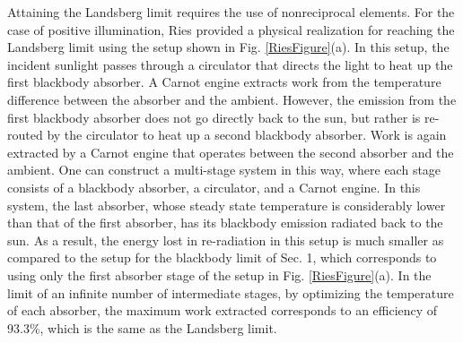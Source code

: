 \documentclass[notitlepage,onecolumn,aps,showpacs,preprintnumbers,amsmath,amssymb,superscriptaddress]{revtex4-1}
\begin{document}
Attaining the Landsberg limit requires the use of nonreciprocal elements. For the case of positive illumination, Ries \citep{ries, greentime} provided a physical realization for reaching the Landsberg limit using the setup shown in Fig. \ref{RiesFigure}(a). In this setup, the incident sunlight passes through a circulator that directs the light to heat up the first blackbody absorber. A Carnot engine extracts work from the temperature difference between the absorber and the ambient. However, the emission from the first blackbody absorber does not go directly back to the sun, but rather is re-routed by the circulator to heat up a second blackbody absorber. Work is again extracted by a Carnot engine that operates between the second absorber and the ambient. One can construct a multi-stage system in this way, where each stage consists of a blackbody absorber, a circulator, and a Carnot engine. In this system, the last absorber, whose steady state temperature is considerably lower than that of the first absorber, has its blackbody emission radiated back to the sun. As a result, the energy lost in re-radiation in this setup is much smaller as compared to the setup for the blackbody limit of Sec. 1, which corresponds to using only the first absorber stage of the setup in Fig. \ref{RiesFigure}(a). In the limit of an infinite number of intermediate stages, by optimizing the temperature of each absorber, the maximum work extracted corresponds to an efficiency of 93.3\%, which is the same as the Landsberg limit. \\
\end{document}
